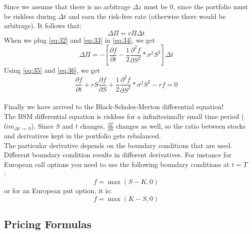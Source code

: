 \documentclass{article}
\begin{document}
Since we assume that there is no arbitrage $\Delta z$ must be 0, since the portfolio must be riskless during $\Delta t$ and earn the risk-free rate (otherwise there would be arbitrage). It follows that:
\begin{equation}\label{eq:35}
    \Delta \Pi = r \Pi \Delta t
\end{equation}
When we plug \ref{eq:32} and \ref{eq:33} in \ref{eq:34}, we get
\begin{equation}\label{eq:36}
    \Delta \Pi = - \left[\frac{\partial f }{\partial t} - \frac{1}{2}\frac{\partial^{2} f }{\partial S^{2}} * \sigma^{2} S^{2}\right] \Delta t
\end{equation}
Using \ref{eq:35} and \ref{eq:36}, we get 
\begin{equation}\label{eq:37}
    \frac{\partial f }{\partial t} + r S \frac{\partial f}{\partial S} +\frac{1}{2}\frac{\partial^{2} f }{\partial S^{2}} * \sigma^{2} S^{2} - rf = 0
\end{equation}\\
Finally we have arrived to the Black-Scholes-Merton differential equation!\\[3ex]
The BSM differential equation is riskless for a infinitesimally small time period ($lim_{\Delta t\to\ 0}$). Since $S$ and $t$ changes, $\frac{\partial f}{\partial S}$ changes as well, so the ratio between stocks and derivatives kept in the portfolio gets rebalanced. \\[2ex]
The particular derivative depends on the boundary conditions that are used. Different boundary condition results in different derivatives. For instance for European call options you need to use the following boundary conditions at $t=T$:
\begin{equation*}
    f = \max (S - K, 0)
\end{equation*}
or for an European put option, it is:
\begin{equation*}
    f = \max (K - S, 0)
\end{equation*}
\subsection{Pricing Formulas}
\end{document}
